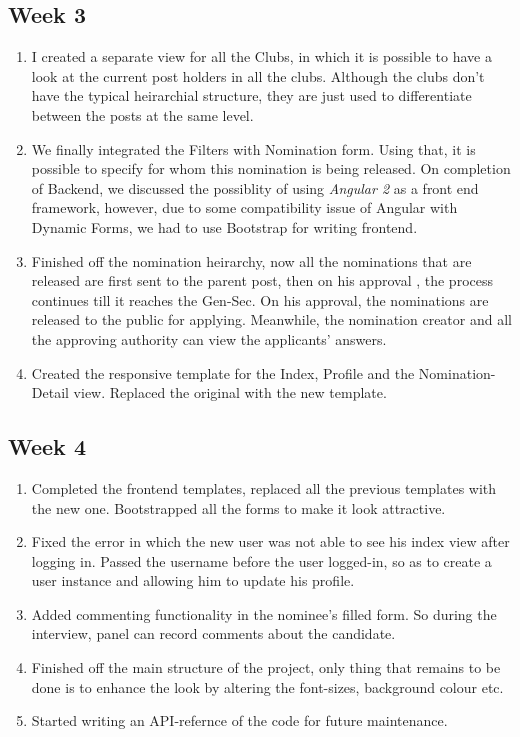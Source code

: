 \documentclass[12pt,a4paper]{scrartcl}
\begin{document}
\subsection{Week 3}
\begin{enumerate}
	\item I created a separate view for all the Clubs, in which it is possible to have a look at the current post holders in all the clubs.
	Although the clubs don't have the typical heirarchial structure, they are just used to differentiate between the posts at the same level.
	\item We finally integrated the Filters with Nomination form. Using that, it is possible to specify for whom this nomination is being released. On completion of Backend, we discussed the possiblity of using \textit{Angular 2} as a front end framework, however, due to some compatibility issue of Angular with Dynamic Forms, we had to use Bootstrap for writing frontend.
	\item Finished off the nomination heirarchy, now all the nominations that are released are first sent to the parent post, then on his approval , the process continues till it reaches the Gen-Sec. On his approval, the nominations are released to the public for applying.
	Meanwhile, the nomination creator and all the approving authority can view the applicants' answers.
	\item Created the responsive template for the Index, Profile and the Nomination-Detail view. Replaced the original with the new template. 
\end{enumerate}

\subsection{Week 4}
\begin{enumerate}
	\item Completed the frontend templates, replaced all the previous templates with the new one. Bootstrapped all the forms to make it look attractive. 
	\item Fixed the error in which the new user was not able to see his index view after logging in. Passed the username before the user logged-in, so as to create a user instance and allowing him to update his profile.
	\item Added commenting functionality in the nominee's filled form. So during the interview, panel can record comments about the candidate.
	\item Finished off the main structure of the project, only thing that remains to be done is to enhance the look by altering the font-sizes, background colour etc.
	\item Started writing an API-refernce of the code for future maintenance. 
\end{enumerate}
\end{document}
